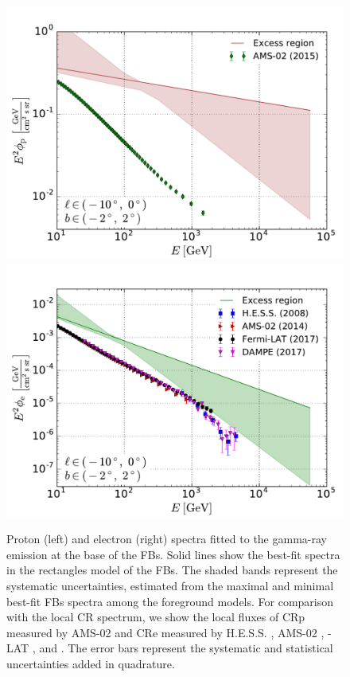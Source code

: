 \begin{figure}[h]
\centering
\includegraphics[width=\twopic\textwidth]{plots/Summary_proton_spectra_0.pdf}
\includegraphics[width=\twopic\textwidth]{plots/Summary_electron_spectra_0.pdf}
  	\caption{
	Proton (left) and electron (right) spectra fitted to the gamma-ray emission at the base of the FBs.
	Solid lines show the best-fit spectra in the rectangles model of the FBs.
	The shaded bands represent the systematic uncertainties, 
	estimated from the maximal and minimal best-fit FBs spectra among the foreground models. 
	For comparison with the local CR spectrum, we show the local fluxes of CRp  measured by AMS-02 \citep{2015PhRvL.114q1103A} and 
	CRe measured by H.E.S.S. \citep{2008PhRvL.101z1104A}, AMS-02 \citep{2014PhRvL.113v1102A}, 
	\Fermi-LAT \citep{2017PhRvD..95h2007A}, and \DAMPE \citep{2017Natur.552...63D}.
	The error bars represent the systematic and statistical uncertainties added in quadrature.}
  	\label{fig:Particle_spectra}
\end{figure}

